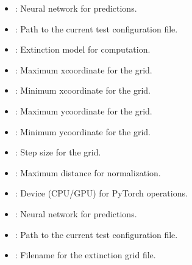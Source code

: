 \documentclass[letterpaper,10pt,english]{sphinxmanual}
\begin{document}
\begin{fulllineitems}
\begin{description}
\begin{itemize}
\item {} 
\sphinxAtStartPar
{}: Neural network for predictions.

\item {} 
\sphinxAtStartPar
{}: Path to the current test configuration file.

\end{itemize}

\begin{itemize}
\item {} 
\sphinxAtStartPar
{}: Extinction model for computation.

\item {} 
\sphinxAtStartPar
{}: Maximum x\sphinxhyphen{}coordinate for the grid.

\item {} 
\sphinxAtStartPar
{}: Minimum x\sphinxhyphen{}coordinate for the grid.

\item {} 
\sphinxAtStartPar
{}: Maximum y\sphinxhyphen{}coordinate for the grid.

\item {} 
\sphinxAtStartPar
{}: Minimum y\sphinxhyphen{}coordinate for the grid.

\item {} 
\sphinxAtStartPar
{}: Step size for the grid.

\item {} 
\sphinxAtStartPar
{}: Maximum distance for normalization.

\item {} 
\sphinxAtStartPar
{}: Device (CPU/GPU) for PyTorch operations.

\item {} 
\sphinxAtStartPar
{}: Neural network for predictions.

\item {} 
\sphinxAtStartPar
{}: Path to the current test configuration file.

\item {} 
\sphinxAtStartPar
{}: Filename for the extinction grid file.


\end{itemize}
\end{description}
\end{fulllineitems}
\end{document}
